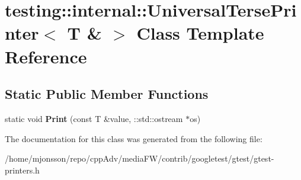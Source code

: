 \hypertarget{classtesting_1_1internal_1_1UniversalTersePrinter_3_01T_01_6_01_4}{}\section{testing\+:\+:internal\+:\+:Universal\+Terse\+Printer$<$ T \& $>$ Class Template Reference}
\label{classtesting_1_1internal_1_1UniversalTersePrinter_3_01T_01_6_01_4}
\subsection*{Static Public Member Functions}
\begin{DoxyCompactItemize}
\item 
\mbox{\label{classtesting_1_1internal_1_1UniversalTersePrinter_3_01T_01_6_01_4_a931f93cc52a3046706c87d0a90640483}} 
static void {\bfseries Print} (const T \&value, \+::std\+::ostream $\ast$os)
\end{DoxyCompactItemize}


The documentation for this class was generated from the following file\+:\begin{DoxyCompactItemize}
\item 
/home/mjonsson/repo/cpp\+Adv/media\+F\+W/contrib/googletest/gtest/gtest-\/printers.\+h\end{DoxyCompactItemize}
